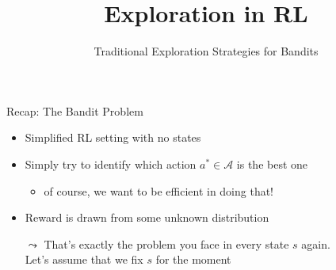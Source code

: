 


\title[Reinforcement Learning: Big Picture]{Exploration in RL}
\subtitle{Traditional Exploration Strategies for Bandits}




	
	\maketitle

\begin{frame}[c]{Recap: The Bandit Problem}

\begin{itemize}
	\item Simplified RL setting with no states
	\item Simply try to identify which action $a^* \in \mathcal{A}$ is the best one
	\begin{itemize}
		\item of course, we want to be efficient in doing that!
	\end{itemize}
	\item Reward is drawn from some unknown distribution
	\bigskip
	\pause
	\item[$\leadsto$] That's exactly the problem you face in every state $s$ again.\\ Let's assume that we fix $s$ for the moment
\end{itemize}

\end{frame}
